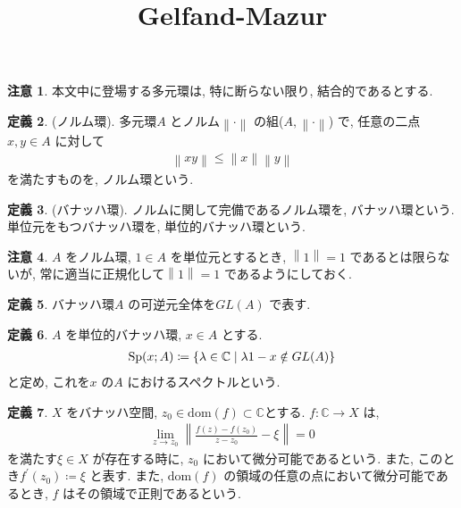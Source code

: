\documentclass[10pt, fleqn, label-section=none]{bxjsarticle}
\title{Gelfand-Mazur}
\date{}
\author{}
\theoremstyle{definition}
\newtheorem{dfn}{定義}[section]
\newtheorem{remark}[dfn]{注意}
\newcommand{\cbra}[1]{\mleft\{#1\mright\}}
\newcommand{\norm}[1]{\left\|#1\right\|}
\renewcommand{\;}{\, ; \,}
\begin{document}
\maketitle



\section{}

\begin{remark}
本文中に登場する多元環は, 特に断らない限り, 結合的であるとする.
\end{remark}


\begin{dfn}(ノルム環). 多元環$A$ とノルム$\norm{\cdot}$ の組($A, \norm{\cdot}$) で, 任意の二点$x, y \in A$ に対して
\begin{align*} \norm{xy} \leq \norm{x} \norm{y} \end{align*}
を満たすものを, ノルム環という. 
\end{dfn}

\begin{dfn}(バナッハ環).
ノルムに関して完備であるノルム環を, バナッハ環という. 単位元をもつバナッハ環を, 単位的バナッハ環という. 
\end{dfn}

\begin{remark}
$A$ をノルム環, $1 \in A$ を単位元とするとき, $\norm{1} = 1$ であるとは限らないが, 常に適当に正規化して$\norm{1} = 1$ であるようにしておく. 
\end{remark}

\begin{dfn}
バナッハ環$A$ の可逆元全体を$GL(A)$ で表す. 
\end{dfn}

\begin{dfn}
$A$ を単位的バナッハ環, $x \in A$ とする. 
\begin{align*} \textrm{Sp} (x; A) \coloneqq \cbra{\lambda \in \mathbb C \mid \lambda 1 - x \notin GL(A)} \end{align*}
と定め, これを$x$ の$A$ におけるスペクトルという. 
\end{dfn}

\begin{dfn}$X$ をバナッハ空間, $z_0 \in  \textrm{dom} (f) \subset \mathbb C $とする. $f :\mathbb C \rightarrow X$ は, 
\begin{align*} \lim_{z \rightarrow z_0} \norm{ \frac{f(z) - f(z_0)}{z-z_0} - \xi   } = 0    \end{align*}
を満たす$\xi \in X$ が存在する時に, $z_0$ において微分可能であるという. また, このとき$f^\prime (z_0) \coloneqq \xi$ と表す. また, $\textrm{dom}(f)$ の領域の任意の点において微分可能であるとき, $f$ はその領域で正則であるという. 
\end{dfn}
\end{document}
